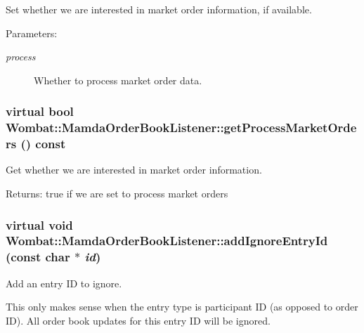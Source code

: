 Set whether we are interested in market order information, if available. 

\begin{Desc}
\item[Parameters:]
\begin{description}
\item[{\em process}]Whether to process market order data. \end{description}
\end{Desc}
\hypertarget{classWombat_1_1MamdaOrderBookListener_6cbac2b8c695c54cc5cda3006f28fcab}{
\subsubsection[getProcessMarketOrders]{\setlength{\rightskip}{0pt plus 5cm}virtual bool Wombat::Mamda\-Order\-Book\-Listener::get\-Process\-Market\-Orders () const}}
\label{classWombat_1_1MamdaOrderBookListener_6cbac2b8c695c54cc5cda3006f28fcab}


Get whether we are interested in market order information. 

\begin{Desc}
\item[Returns:]true if we are set to process market orders \end{Desc}
\hypertarget{classWombat_1_1MamdaOrderBookListener_1d3802c30ebd8939435f74a634dc11fc}{
\subsubsection[addIgnoreEntryId]{\setlength{\rightskip}{0pt plus 5cm}virtual void Wombat::Mamda\-Order\-Book\-Listener::add\-Ignore\-Entry\-Id (const char $\ast$ {\em id})}}
\label{classWombat_1_1MamdaOrderBookListener_1d3802c30ebd8939435f74a634dc11fc}


Add an entry ID to ignore. 

This only makes sense when the entry type is participant ID (as opposed to order ID). All order book updates for this entry ID will be ignored.

